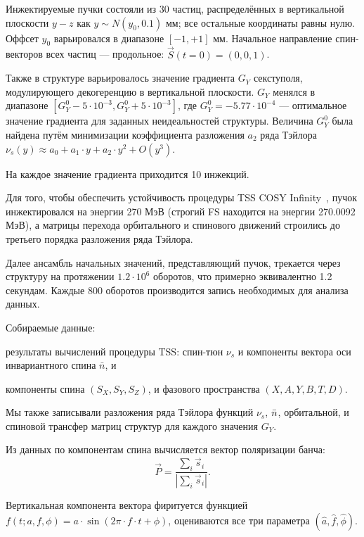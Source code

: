 Инжектируемые пучки состояли из 30 частиц, распределённых в вертикальной
плоскости $y-z$ как $y\sim N(y_0, 0.1)$ мм; все остальные координаты равны нулю.
Оффсет $y_0$ варьировался в диапазоне $[-1, +1]$ мм. Начальное
направление спин-векторов всех частиц --- продольное: $\vec S(t=0) = (0,0,1)$.

Также в структуре варьировалось значение градиента $G_Y$ секступоля,
модулирующего декогеренцию в вертикальной плоскости. $G_Y$ менялся в
диапазоне $[G_Y^0 - 5\cdot10^{-3}, G_Y^0 + 5\cdot10^{-3}]$, где
$G_Y^0=-5.77\cdot 10^{-4}$ --- оптимальное значение градиента для заданных 
неидеальностей структуры. Величина $G_Y^0$ была найдена путём минимизации коэффициента разложения $a_2$
ряда Тэйлора $\nu_s(y) \approx a_0 + a_1\cdot y + a_2\cdot y^2 + O(y^3)$.

На каждое значение градиента приходится 10 инжекций.

Для того, чтобы обеспечить устойчивость процедуры TSS COSY Infinity~\cite{COSYINF:Manual:BeamPhys}, пучок инжектировался на энергии 270 МэВ (строгий FS находится на энергии 270.0092 МэВ), а матрицы перехода орбитального и спинового движений строились до третьего порядка разложения ряда Тэйлора. 

Далее ансамбль начальных значений, представляющий пучок, трекается
через структуру на протяжении $1.2\cdot10^6$ оборотов, что
примерно эквивалентно 1.2 секундам. Каждые 800 оборотов производится
запись необходимых для анализа данных.

Собираемые данные: 
\begin{enumerate*}
	\item результаты вычислений процедуры TSS: спин-тюн $\nu_s$ и компоненты вектора оси инвариантного спина $\bar n$, и
	\item компоненты спина $(S_X, S_Y, S_Z)$, и фазового пространства $(X,A,Y,B,T,D)$.
\end{enumerate*}
Мы также записывали разложения ряда Тэйлора функций $\nu_s$, $\bar n$, орбитальной, и спиновой трансфер матриц
структур для каждого значения $G_Y$.

Из данных по компонентам спина вычисляется вектор поляризации банча:
\begin{equation}\label{eq:polarization_formula}
\vec P = \frac{\sum_i\vec s_i}{|\sum_i\vec s_i|}.
\end{equation}

Вертикальная компонента вектора фиритуется функцией $f(t; a,f,\phi) = a\cdot \sin(2\pi\cdot
f\cdot t + \phi)$, оцениваются все три параметра $(\hat a, \hat f,
\hat\phi)$. 

